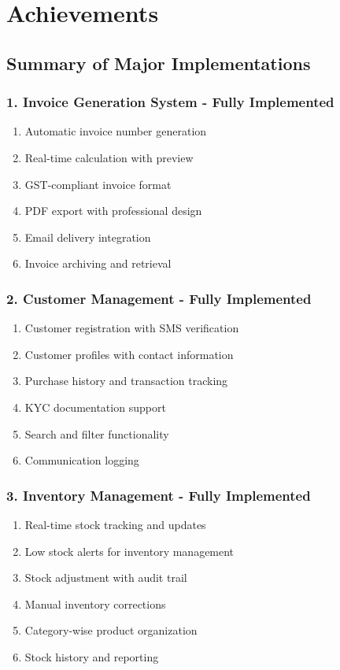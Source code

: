 \documentclass[12pt,a4paper]{report}
\begin{document}
\newpage

\chapter{Achievements}
\section{Summary of Major Implementations}

\subsection{1. Invoice Generation System - Fully Implemented}
\begin{enumerate}[label=\roman*)]
    \item Automatic invoice number generation
    \item Real-time calculation with preview
    \item GST-compliant invoice format
    \item PDF export with professional design
    \item Email delivery integration
    \item Invoice archiving and retrieval
\end{enumerate}

\subsection{2. Customer Management - Fully Implemented}
\begin{enumerate}[label=\roman*)]
    \item Customer registration with SMS verification
    \item Customer profiles with contact information
    \item Purchase history and transaction tracking
    \item KYC documentation support
    \item Search and filter functionality
    \item Communication logging
\end{enumerate}

\subsection{3. Inventory Management - Fully Implemented}
\begin{enumerate}[label=\roman*)]
    \item Real-time stock tracking and updates
    \item Low stock alerts for inventory management
    \item Stock adjustment with audit trail
    \item Manual inventory corrections
    \item Category-wise product organization
    \item Stock history and reporting
\end{enumerate}
\end{document}
